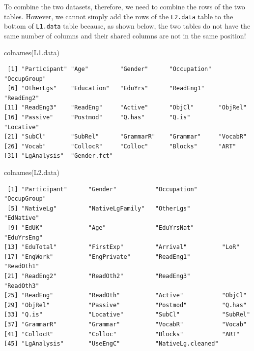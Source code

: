 \documentclass[
  letterpaper,
  DIV=11,
  numbers=noendperiod]{scrreprt}
\newenvironment{Shaded}{\begin{snugshade}}{\end{snugshade}}
\newcommand{\FunctionTok}[1]{\textcolor[rgb]{0.28,0.35,0.67}{#1}}
\newcommand{\NormalTok}[1]{\textcolor[rgb]{0.00,0.23,0.31}{#1}}
\begin{document}
To combine the two datasets, therefore, we need to combine the rows of
the two tables. However, we cannot simply add the rows of the
\texttt{L2.data} table to the bottom of \texttt{L1.data} table because,
as shown below, the two tables do not have the same number of columns
and their shared columns are not in the same position!

\begin{Shaded}
\begin{Highlighting}[]
\FunctionTok{colnames}\NormalTok{(L1.data)}
\end{Highlighting}
\end{Shaded}

\begin{verbatim}
 [1] "Participant" "Age"         "Gender"      "Occupation"  "OccupGroup" 
 [6] "OtherLgs"    "Education"   "EduYrs"      "ReadEng1"    "ReadEng2"   
[11] "ReadEng3"    "ReadEng"     "Active"      "ObjCl"       "ObjRel"     
[16] "Passive"     "Postmod"     "Q.has"       "Q.is"        "Locative"   
[21] "SubCl"       "SubRel"      "GrammarR"    "Grammar"     "VocabR"     
[26] "Vocab"       "CollocR"     "Colloc"      "Blocks"      "ART"        
[31] "LgAnalysis"  "Gender.fct" 
\end{verbatim}

\begin{Shaded}
\begin{Highlighting}[]
\FunctionTok{colnames}\NormalTok{(L2.data)}
\end{Highlighting}
\end{Shaded}

\begin{verbatim}
 [1] "Participant"      "Gender"           "Occupation"       "OccupGroup"      
 [5] "NativeLg"         "NativeLgFamily"   "OtherLgs"         "EdNative"        
 [9] "EdUK"             "Age"              "EduYrsNat"        "EduYrsEng"       
[13] "EduTotal"         "FirstExp"         "Arrival"          "LoR"             
[17] "EngWork"          "EngPrivate"       "ReadEng1"         "ReadOth1"        
[21] "ReadEng2"         "ReadOth2"         "ReadEng3"         "ReadOth3"        
[25] "ReadEng"          "ReadOth"          "Active"           "ObjCl"           
[29] "ObjRel"           "Passive"          "Postmod"          "Q.has"           
[33] "Q.is"             "Locative"         "SubCl"            "SubRel"          
[37] "GrammarR"         "Grammar"          "VocabR"           "Vocab"           
[41] "CollocR"          "Colloc"           "Blocks"           "ART"             
[45] "LgAnalysis"       "UseEngC"          "NativeLg.cleaned"
\end{verbatim}
\end{document}
